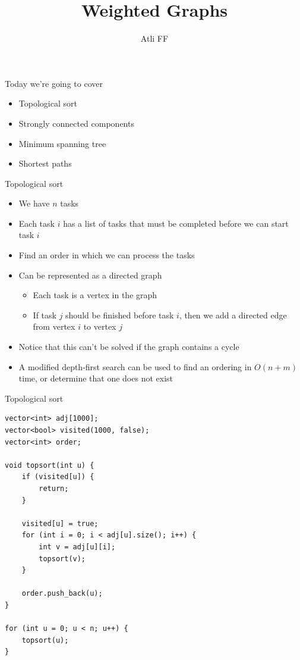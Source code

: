 \documentclass{beamer}
\title{Weighted Graphs}
\author{Atli FF}
\institute{\href{http://ru.is/td}{School of Computer Science} \\[2pt] \href{http://ru.is}{ReykjavÃ­k University}}
\begin{document}
\maketitle

\begin{frame}[plain]{Today we're going to cover}
    \begin{itemize}
        \item Topological sort
        \item Strongly connected components
        \item Minimum spanning tree
        \item Shortest paths
    \end{itemize}
\end{frame}

\begin{frame}[plain]{Topological sort}
    \vspace{5pt}
    \begin{itemize}
        \item We have $n$ tasks
        \item Each task $i$ has a list of tasks that must be completed before we can start task $i$
        \item Find an order in which we can process the tasks
        \vspace{5pt}
        \item Can be represented as a directed graph
            \begin{itemize}
                \item Each task is a vertex in the graph
                \item If task $j$ should be finished before task $i$, then we add a directed edge from vertex $i$ to vertex $j$
            \end{itemize}
        \vspace{5pt}
        \item Notice that this can't be solved if the graph contains a cycle
        \vspace{5pt}
        \item A modified depth-first search can be used to find an ordering in $O(n + m)$ time, or determine that one does not exist
    \end{itemize}
\end{frame}

\begin{frame}{Topological sort}
    \begin{verbatim}
vector<int> adj[1000];
vector<bool> visited(1000, false);
vector<int> order;

void topsort(int u) {
    if (visited[u]) {
        return;
    }

    visited[u] = true;
    for (int i = 0; i < adj[u].size(); i++) {
        int v = adj[u][i];
        topsort(v);
    }

    order.push_back(u);
}

for (int u = 0; u < n; u++) {
    topsort(u);
}
    \end{verbatim}
\end{frame}
\end{document}

